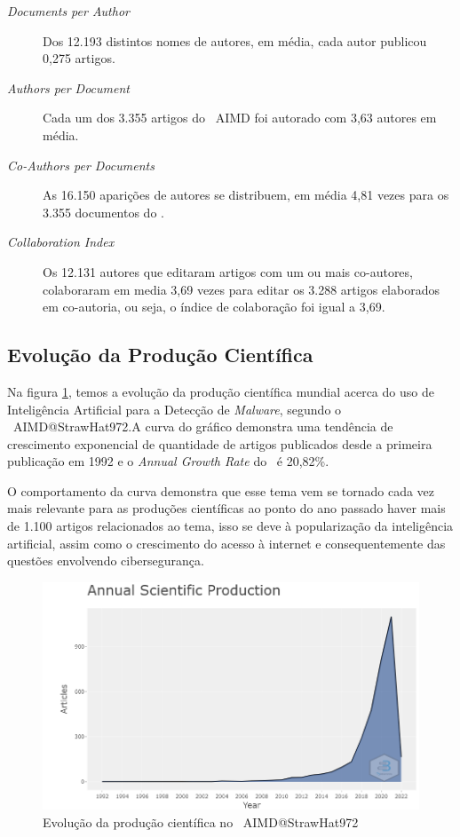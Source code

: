 \begin{description}
    \item [\textit{Documents per Author}] Dos 12.193 distintos nomes de autores, em média, cada autor publicou 0,275 artigos.
    
    \item [\textit{Authors per Document}] Cada um dos 3.355 artigos do \dataset\ AIMD foi autorado com 3,63 autores em média.
    
    \item [\textit{Co-Authors per Documents}] As 16.150 aparições de autores se distribuem, em média 4,81 vezes para os 3.355 documentos do \dataset.
    
    \item [\textit{Collaboration Index}] Os 12.131 autores que editaram artigos com um ou mais co-autores, colaboraram em media 3,69 vezes para editar os  3.288 artigos elaborados em co-autoria, ou seja, o índice de colaboração foi igual a 3,69.
\end{description}

\subsection{Evolução da Produção Científica}
\label{StrawHat972:EvolProd}

Na figura \ref{fig:StrawHat972:AnnualSciProduction}, temos a evolução da produção científica mundial acerca do uso de Inteligência Artificial para a Detecção de \textit{Malware}, segundo o \dataset\ AIMD@StrawHat972.A curva do gráfico demonstra uma tendência de crescimento exponencial de quantidade de artigos publicados desde a primeira publicação em 1992 e o \textit{Annual Growth Rate} do \dataset\ é 20,82\%.

O comportamento da curva demonstra que esse tema vem se tornado cada vez mais relevante para as produções científicas ao ponto do ano passado haver mais de 1.100 artigos relacionados ao tema, isso se deve à popularização da inteligência artificial, assim como o crescimento do acesso à internet e consequentemente das questões envolvendo cibersegurança.

\begin{figure}[H]
    \centering
    \includegraphics[width=1\textwidth]{experiments/StrawHat972/PesqBibliogr/IA-DeteccaoMalware/WoS-20220209/Imagens/AIMDAnnualScientificProduction.png}
    \caption{Evolução da produção científica no \dataset\ AIMD@StrawHat972}
    \label{fig:StrawHat972:AnnualSciProduction}
\end{figure}

